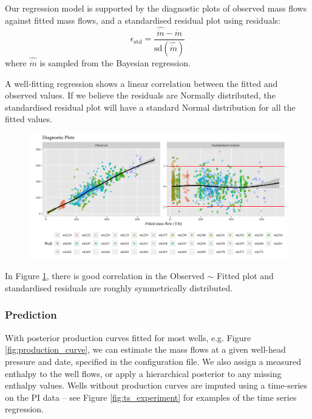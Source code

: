 \documentclass[a4paper, 12pt]{article}
\begin{document}
Our regression model is supported by the diagnostic plots of observed mass flows against fitted mass flows, and a standardised residual plot using residuals:
\begin{equation}
\epsilon_\text{std} = \frac{\hat{\dot{m}} - \dot{m}}{\text{sd}\left( \hat{\dot{m}} \right)}
\end{equation}
where $\hat{\dot{m}}$ is sampled from the Bayesian regression.

A well-fitting regression shows a linear correlation between the fitted and observed values. If we believe the residuals are Normally distributed, the standardised residual plot will have a standard Normal distribution for all the fitted values. 

\begin{figure}
\centering
  \includegraphics[width=\linewidth]{media/diagnostics}
  \label{fig:diagnostics}
\end{figure}

In Figure \ref{fig:diagnostics}, there is good correlation in the Observed $\sim$ Fitted plot and standardised residuals are roughly symmetrically distributed. %

\subsubsection{Prediction}
With posterior production curves fitted for most wells, e.g. Figure \ref{fig:production_curve}, we can estimate the mass flows at a given well-head pressure and date, specified in the configuration file. We also assign a measured enthalpy to the well flows, or apply a hierarchical posterior to any missing enthalpy values. Wells without production curves are imputed using a time-series on the PI data -- see Figure \ref{fig:ts_experiment} for examples of the time series regression.
\end{document}
